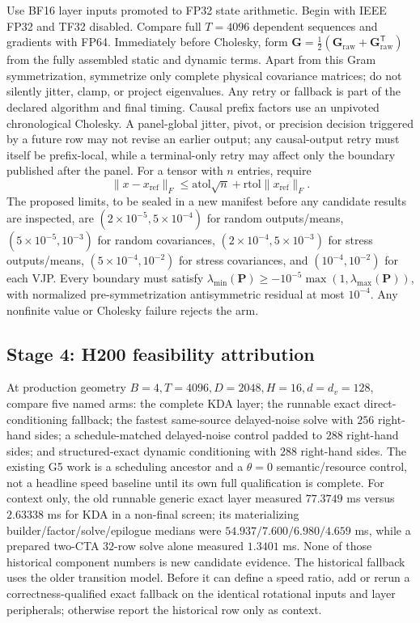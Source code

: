 \documentclass[11pt]{article}
\newcommand{\ve}[1]{\boldsymbol{#1}}
\newcommand{\tr}{\mathsf{T}}
\begin{document}
Use BF16 layer inputs promoted to FP32 state arithmetic.  Begin with IEEE FP32 and TF32 disabled.
Compare full $T=4096$ dependent sequences and gradients with FP64.  Immediately before Cholesky,
form $\ve{G}=\tfrac12(\ve{G}_{\mathrm{raw}}+\ve{G}_{\mathrm{raw}}^{\tr})$ from the fully
assembled static and dynamic terms.  Apart from this Gram symmetrization, symmetrize only complete
physical covariance matrices; do not silently jitter, clamp, or project eigenvalues.  Any retry
or fallback is part of the declared algorithm and final timing.  Causal prefix factors use an
unpivoted chronological Cholesky.  A panel-global jitter, pivot, or precision decision triggered by
a future row may not revise an earlier output; any causal-output retry must itself be prefix-local,
while a terminal-only retry may affect only the boundary published after the panel.
For a tensor with $n$ entries, require
\begin{equation}
  \|x-x_{\mathrm{ref}}\|_F
  \leq \mathrm{atol}\sqrt n+\mathrm{rtol}\|x_{\mathrm{ref}}\|_F.
\end{equation}
The proposed limits, to be sealed in a new manifest before any candidate results are inspected,
are $(2\times10^{-5},5\times10^{-4})$ for random outputs/means,
$(5\times10^{-5},10^{-3})$ for random covariances,
$(2\times10^{-4},5\times10^{-3})$ for stress outputs/means,
$(5\times10^{-4},10^{-2})$ for stress covariances, and
$(10^{-4},10^{-2})$ for each VJP.  Every boundary must satisfy
$\lambda_{\min}(\ve{P})\geq-10^{-5}\max(1,\lambda_{\max}(\ve{P}))$, with normalized
pre-symmetrization antisymmetric residual at most $10^{-4}$.  Any nonfinite value or Cholesky
failure rejects the arm.

\subsection{Stage 4: H200 feasibility attribution}

At production geometry $B=4,T=4096,D=2048,H=16,d=d_v=128$, compare five named arms:
the complete KDA layer; the runnable exact direct-conditioning fallback; the fastest same-source
delayed-noise solve with $256$ right-hand sides; a schedule-matched delayed-noise control padded to
$288$ right-hand sides; and structured-exact dynamic conditioning with $288$ right-hand sides.
The existing G5 work is a scheduling ancestor and a $\theta=0$ semantic/resource control, not a
headline speed baseline until its own full qualification is complete.  For context only, the old
runnable generic exact layer measured $77.3749$ ms versus $2.63338$ ms for KDA in a non-final
screen; its materializing builder/factor/solve/epilogue medians were
$54.937/7.600/6.980/4.659$ ms, while a prepared two-CTA $32$-row solve alone measured
$1.3401$ ms.  None of those historical component numbers is new candidate evidence.
The historical fallback uses the older transition model.  Before it can define a speed ratio, add
or rerun a correctness-qualified exact fallback on the identical rotational inputs and layer
peripherals; otherwise report the historical row only as context.
\end{document}
